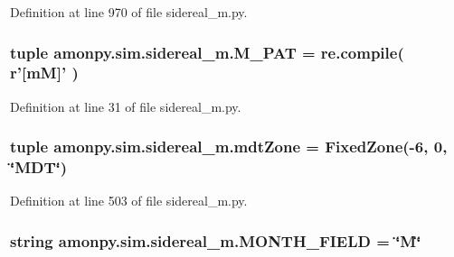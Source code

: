 Definition at line 970 of file sidereal\-\_\-m.\-py.

\hypertarget{namespaceamonpy_1_1sim_1_1sidereal__m_a42714b75b39de317bf61fb9953455c17}{
\subsubsection[{M\-\_\-\-P\-A\-T}]{\setlength{\rightskip}{0pt plus 5cm}tuple amonpy.\-sim.\-sidereal\-\_\-m.\-M\-\_\-\-P\-A\-T = re.\-compile( r'\mbox{[}m\-M\mbox{]}' )}}\label{namespaceamonpy_1_1sim_1_1sidereal__m_a42714b75b39de317bf61fb9953455c17}


Definition at line 31 of file sidereal\-\_\-m.\-py.

\hypertarget{namespaceamonpy_1_1sim_1_1sidereal__m_ac8316d030fa26bccdcce995a5f57f363}{
\subsubsection[{mdt\-Zone}]{\setlength{\rightskip}{0pt plus 5cm}tuple amonpy.\-sim.\-sidereal\-\_\-m.\-mdt\-Zone = {\bf Fixed\-Zone}(-\/6, 0, \char`\"{}M\-D\-T\char`\"{})}}\label{namespaceamonpy_1_1sim_1_1sidereal__m_ac8316d030fa26bccdcce995a5f57f363}


Definition at line 503 of file sidereal\-\_\-m.\-py.

\hypertarget{namespaceamonpy_1_1sim_1_1sidereal__m_a873ef54e9b5478d5f40ca25fc4fc07be}{
\subsubsection[{M\-O\-N\-T\-H\-\_\-\-F\-I\-E\-L\-D}]{\setlength{\rightskip}{0pt plus 5cm}string amonpy.\-sim.\-sidereal\-\_\-m.\-M\-O\-N\-T\-H\-\_\-\-F\-I\-E\-L\-D = \char`\"{}M\char`\"{}}}\label{namespaceamonpy_1_1sim_1_1sidereal__m_a873ef54e9b5478d5f40ca25fc4fc07be}


